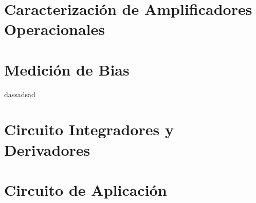 








\tableofcontents
\newpage


\section{Caracterización de Amplificadores Operacionales}
	
\newpage	
\section{Medición de Bias}
    
    dassadsad
\newpage
\section{Circuito Integradores y Derivadores}
    
    \newpage
\section{Circuito de Aplicación}
    
    \newpage





